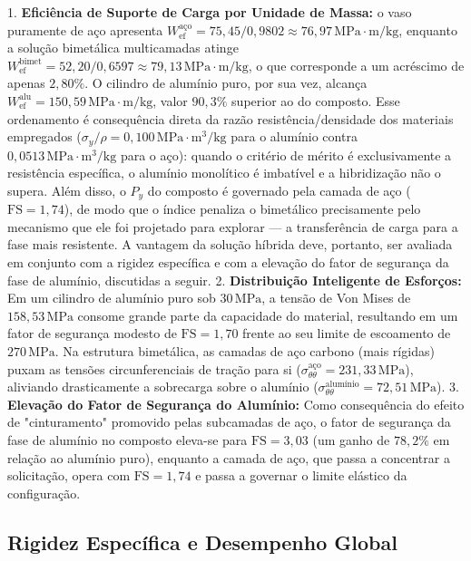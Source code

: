 1. \textbf{Eficiência de Suporte de Carga por Unidade de Massa:} o vaso puramente de aço apresenta $W_{\text{ef}}^{\text{aço}} = 75,45 / 0,9802 \approx 76,97 \, \text{MPa}\cdot\text{m/kg}$, enquanto a solução bimetálica multicamadas atinge $W_{\text{ef}}^{\text{bimet}} = 52,20 / 0,6597 \approx 79,13 \, \text{MPa}\cdot\text{m/kg}$, o que corresponde a um acréscimo de apenas $2,80\%$. O cilindro de alumínio puro, por sua vez, alcança $W_{\text{ef}}^{\text{alu}} = 150,59 \, \text{MPa}\cdot\text{m/kg}$, valor $90,3\%$ superior ao do composto. Esse ordenamento é consequência direta da razão resistência/densidade dos materiais empregados ($\sigma_y/\rho = 0,100 \, \text{MPa}\cdot\text{m}^3/\text{kg}$ para o alumínio contra $0,0513 \, \text{MPa}\cdot\text{m}^3/\text{kg}$ para o aço): quando o critério de mérito é exclusivamente a resistência específica, o alumínio monolítico é imbatível e a hibridização não o supera. Além disso, o $P_y$ do composto é governado pela camada de aço ($\text{FS} = 1,74$), de modo que o índice penaliza o bimetálico precisamente pelo mecanismo que ele foi projetado para explorar — a transferência de carga para a fase mais resistente. A vantagem da solução híbrida deve, portanto, ser avaliada em conjunto com a rigidez específica e com a elevação do fator de segurança da fase de alumínio, discutidas a seguir.
2. \textbf{Distribuição Inteligente de Esforços:} Em um cilindro de alumínio puro sob $30 \, \text{MPa}$, a tensão de Von Mises de $158,53 \, \text{MPa}$ consome grande parte da capacidade do material, resultando em um fator de segurança modesto de $\text{FS} = 1,70$ frente ao seu limite de escoamento de $270 \, \text{MPa}$. Na estrutura bimetálica, as camadas de aço carbono (mais rígidas) puxam as tensões circunferenciais de tração para si ($\sigma_{\theta\theta}^{\text{aço}} = 231,33 \, \text{MPa}$), aliviando drasticamente a sobrecarga sobre o alumínio ($\sigma_{\theta\theta}^{\text{alumínio}} = 72,51 \, \text{MPa}$).
3. \textbf{Elevação do Fator de Segurança do Alumínio:} Como consequência do efeito de "cinturamento" promovido pelas subcamadas de aço, o fator de segurança da fase de alumínio no composto eleva-se para \textbf{$\text{FS} = 3,03$} (um ganho de $78,2\%$ em relação ao alumínio puro), enquanto a camada de aço, que passa a concentrar a solicitação, opera com $\text{FS} = 1,74$ e passa a governar o limite elástico da configuração.

\subsection{Rigidez Específica e Desempenho Global}


